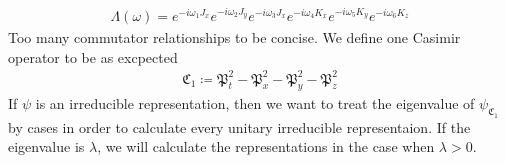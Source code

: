 \documentclass[compress,aspectratio=169,10pt,usenames,dvipsnames]{beamer}
\begin{document}
%
\begin{frame}
\vfill
\begin{equation}
\begin{aligned}
	\Lambda (\omega) = e^{-i\omega_1J_x}e^{-i\omega_2J_y}e^{-i\omega_3J_x}e^{-i\omega_4K_x}e^{-i\omega_5K_y}e^{-i\omega_6K_z}
\end{aligned}
\end{equation}
\vfill
Too many commutator relationships to be concise.
\vfill
We define one Casimir operator to be as excpected 
\begin{equation}
\begin{aligned}
	\mathfrak{C}_1 \coloneq \mathfrak{P}_t^2 -  \mathfrak{P}_x^2 -\mathfrak{P}_y^2- \mathfrak{P}_z^2
\end{aligned}
\end{equation}
If $\psi$ is an irreducible representation, then we want to treat the eigenvalue of $\psi_{\mathfrak{C}_1}$ by cases in order to calculate every unitary irreducible representaion. If the eigenvalue is $\lambda$, we will calculate the representations in the case when $\lambda >0$. 
\vfill
\end{frame}
\end{document}
